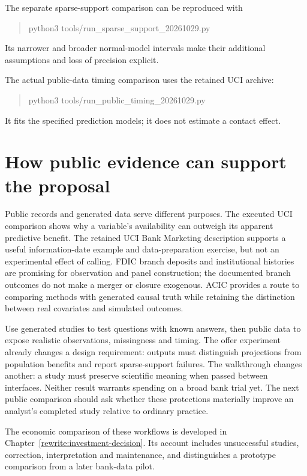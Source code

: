 The separate sparse-support comparison can be reproduced with
\begin{quote}\small\ttfamily
python3 tools/run\_sparse\_support\_20261029.py
\end{quote}
Its narrower and broader normal-model intervals make their additional
assumptions and loss of precision explicit.

The actual public-data timing comparison uses the retained UCI archive:
\begin{quote}\small\ttfamily
python3 tools/run\_public\_timing\_20261029.py
\end{quote}
It fits the specified prediction models; it does not estimate a contact effect.

\section{How public evidence can support the proposal}
Public records and generated data serve different purposes. The executed UCI
comparison shows why a variable's availability can outweigh its apparent
predictive benefit. The retained UCI
Bank Marketing description supports a useful information-date example and
data-preparation exercise, but not an experimental effect of calling. FDIC
branch deposits and institutional histories are promising for observation and
panel construction; the documented branch outcomes do not make a merger or
closure exogenous. ACIC provides a route to comparing methods with generated
causal truth while retaining the distinction between real covariates and
simulated outcomes.
\citep{pd15_uci_bank,pd15_fdic_sod,pd15_fdic_api_spec,pd15_acic_pinned}

Use generated studies to test questions with known answers, then public data
to expose realistic observations, missingness and timing. The offer experiment
already changes a design requirement: outputs must distinguish projections
from population benefits and report sparse-support failures. The walkthrough
changes another: a study must preserve scientific meaning when passed between
interfaces. Neither result warrants spending on a broad bank trial yet. The
next public comparison should ask whether these protections materially improve
an analyst's completed study relative to ordinary practice.

The economic comparison of these workflows is developed in
Chapter~\ref{rewrite:investment-decision}. Its account includes unsuccessful
studies, correction, interpretation and maintenance, and distinguishes a
prototype comparison from a later bank-data pilot.


